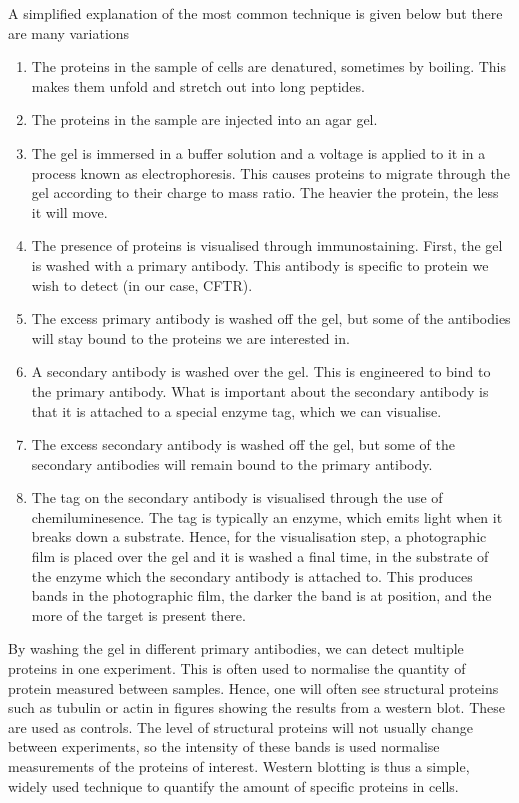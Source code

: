 A simplified explanation of the most common technique is given below but there are many variations
\begin{enumerate}
	\item The proteins in the sample of cells are denatured, sometimes by boiling. This makes them unfold and stretch out into long peptides. 
	\item The proteins in the sample are injected into an agar gel.
	\item The gel is immersed in a buffer solution and a voltage is applied to it in a process known as electrophoresis. This causes proteins to migrate through the gel according to their charge to mass ratio. The heavier the protein, the less it will move. 
	\item The presence of proteins is visualised through immunostaining. First, the gel is washed with a primary antibody. This antibody is specific to protein we wish to detect (in our case, CFTR). 
	\item The excess primary antibody is washed off the gel, but some of the antibodies will stay bound to the proteins we are interested in. 
	\item A secondary antibody is washed over the gel. This is engineered to bind to the primary antibody. What is important about the secondary antibody is that it is attached to a special enzyme tag, which we can visualise.  
	\item The excess secondary antibody is washed off the gel, but some of the secondary antibodies will remain bound to the primary antibody.
	\item The tag on the secondary antibody is visualised through the use of chemiluminesence. The tag is typically an enzyme, which emits light when it breaks down a substrate. Hence, for the visualisation step, a photographic film is placed over the gel and it is washed a final time, in the substrate of the enzyme which the secondary antibody is attached to. This produces bands in the photographic film, the darker the band is at position, and the more of the target is present there.
\end{enumerate}
By washing the gel in different primary antibodies, we can detect multiple proteins in one experiment. This is often used to normalise the quantity of protein measured between samples. Hence, one will often see structural proteins such as tubulin or actin in figures showing the results from a western blot. These are used as controls. The level of structural proteins will not usually change between experiments, so the intensity of these bands is used normalise measurements of the proteins of interest. Western blotting is thus a simple, widely used technique to quantify the amount of specific proteins in  cells. 

